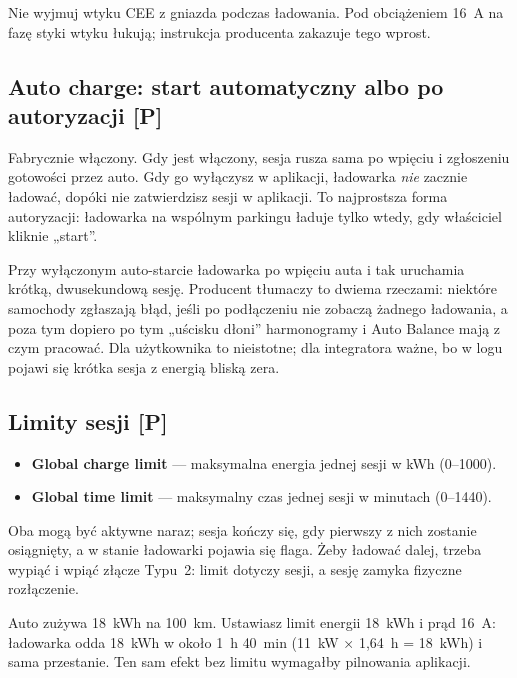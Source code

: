 \documentclass[11pt,a4paper]{article}
\newcommand{\tagP}{\textcolor{apgreen}{\textbf{[P]}}}
\begin{document}
\begin{wazne}
Nie wyjmuj wtyku CEE z gniazda podczas ładowania. Pod obciążeniem 16~A na fazę styki wtyku łukują; instrukcja producenta zakazuje tego wprost.
\end{wazne}

\subsection{Auto charge: start automatyczny albo po autoryzacji \tagP}

Fabrycznie włączony. Gdy jest włączony, sesja rusza sama po wpięciu i zgłoszeniu gotowości przez auto. Gdy go wyłączysz w aplikacji, ładowarka \emph{nie} zacznie ładować, dopóki nie zatwierdzisz sesji w aplikacji. To najprostsza forma autoryzacji: ładowarka na wspólnym parkingu ładuje tylko wtedy, gdy właściciel kliknie „start”.

\begin{info}
Przy wyłączonym auto-starcie ładowarka po wpięciu auta i tak uruchamia krótką, dwusekundową sesję. Producent tłumaczy to dwiema rzeczami: niektóre samochody zgłaszają błąd, jeśli po podłączeniu nie zobaczą żadnego ładowania, a poza tym dopiero po tym „uścisku dłoni” harmonogramy i Auto Balance mają z czym pracować. Dla użytkownika to nieistotne; dla integratora ważne, bo w logu pojawi się krótka sesja z energią bliską zera.
\end{info}

\subsection{Limity sesji \tagP}

\begin{itemize}
\item \textbf{Global charge limit} — maksymalna energia jednej sesji w kWh (0–1000).
\item \textbf{Global time limit} — maksymalny czas jednej sesji w minutach (0–1440).
\end{itemize}

Oba mogą być aktywne naraz; sesja kończy się, gdy pierwszy z nich zostanie osiągnięty, a w stanie ładowarki pojawia się flaga. Żeby ładować dalej, trzeba wypiąć i wpiąć złącze Typu~2: limit dotyczy sesji, a sesję zamyka fizyczne rozłączenie.

\begin{przyklad}
Auto zużywa 18~kWh na 100~km. Ustawiasz limit energii 18~kWh i prąd 16~A: ładowarka odda 18~kWh w około 1~h 40~min (11~kW × 1,64~h = 18~kWh) i sama przestanie. Ten sam efekt bez limitu wymagałby pilnowania aplikacji.
\end{przyklad}
\end{document}
